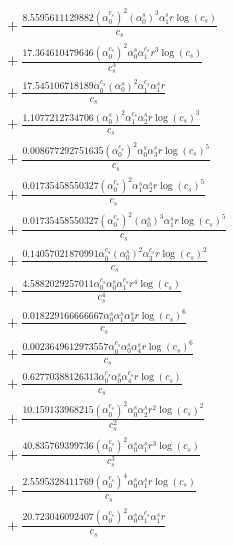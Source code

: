 \documentclass[10pt]{article}
\begin{document}
\begin{align*}
&{}  + \frac{8.5595611129882 \left(\alpha_{0}^{c_s}\right)^{2} \left(\alpha_{0}^s\right)^{3} \alpha_{1}^s r \log{\left(c_{s} \right)}}{c_{s}} \\
&{}  + \frac{17.364610479646 \left(\alpha_{0}^{c_s}\right)^{2} \alpha_{0}^s \alpha_{1}^{c_s} r^{3} \log{\left(c_{s} \right)}}{c_{s}^{3}} \\
&{}  + \frac{17.545106718189 \alpha_{0}^{c_s} \left(\alpha_{0}^s\right)^{2} \alpha_{1}^{c_s} \alpha_{1}^s r}{c_{s}} \\
&{}  + \frac{1.1077212734706 \left(\alpha_{0}^s\right)^{2} \alpha_{1}^{c_s} \alpha_{2}^s r \log{\left(c_{s} \right)}^{3}}{c_{s}} \\
&{}  + \frac{0.008677292751635 \left(\alpha_{0}^{c_s}\right)^{2} \alpha_{0}^s \alpha_{3}^s r \log{\left(c_{s} \right)}^{5}}{c_{s}} \\
&{}  + \frac{0.01735458550327 \left(\alpha_{0}^{c_s}\right)^{2} \alpha_{1}^s \alpha_{2}^s r \log{\left(c_{s} \right)}^{5}}{c_{s}} \\
&{}  + \frac{0.01735458550327 \left(\alpha_{0}^{c_s}\right)^{2} \left(\alpha_{0}^s\right)^{3} \alpha_{1}^s r \log{\left(c_{s} \right)}^{5}}{c_{s}} \\
&{}  + \frac{0.14057021870991 \alpha_{0}^{c_s} \left(\alpha_{0}^s\right)^{2} \alpha_{3}^{c_s} r \log{\left(c_{s} \right)}^{2}}{c_{s}} \\
&{}  + \frac{4.5882029257011 \alpha_{0}^{c_s} \alpha_{0}^s \alpha_{1}^{c_s} r^{4} \log{\left(c_{s} \right)}}{c_{s}^{4}} \\
&{}  + \frac{0.018229166666667 \alpha_{0}^s \alpha_{1}^s \alpha_{3}^s r \log{\left(c_{s} \right)}^{6}}{c_{s}} \\
&{}  + \frac{0.0023649612973557 \alpha_{0}^{c_s} \alpha_{0}^s \alpha_{4}^s r \log{\left(c_{s} \right)}^{6}}{c_{s}} \\
&{}  + \frac{0.62770388126313 \alpha_{0}^{c_s} \alpha_{0}^s \alpha_{4}^{c_s} r \log{\left(c_{s} \right)}}{c_{s}} \\
&{}  + \frac{10.159133968215 \left(\alpha_{0}^{c_s}\right)^{2} \alpha_{0}^s \alpha_{2}^s r^{2} \log{\left(c_{s} \right)}^{2}}{c_{s}^{2}} \\
&{}  + \frac{40.835769399736 \left(\alpha_{0}^{c_s}\right)^{2} \alpha_{0}^s \alpha_{1}^s r^{3} \log{\left(c_{s} \right)}}{c_{s}^{3}} \\
&{}  + \frac{2.5595328411769 \left(\alpha_{0}^{c_s}\right)^{4} \alpha_{0}^s \alpha_{1}^s r \log{\left(c_{s} \right)}}{c_{s}} \\
&{}  + \frac{20.723046092407 \left(\alpha_{0}^{c_s}\right)^{2} \alpha_{0}^s \alpha_{1}^{c_s} \alpha_{1}^s r}{c_{s}} \\

\end{align*}
\end{document}
